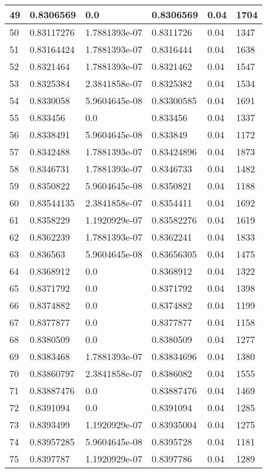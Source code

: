 \begin{longtable}{|l|l|l|l|l|l|}
49 & 0.8306569 & 0.0 & 0.8306569 & 0.04 & 1704 \\ \hline 
50 & 0.83117276 & 1.7881393e-07 & 0.8311726 & 0.04 & 1347 \\ \hline 
51 & 0.83164424 & 1.7881393e-07 & 0.8316444 & 0.04 & 1638 \\ \hline 
52 & 0.8321464 & 1.7881393e-07 & 0.8321462 & 0.04 & 1547 \\ \hline 
53 & 0.8325384 & 2.3841858e-07 & 0.8325382 & 0.04 & 1534 \\ \hline 
54 & 0.8330058 & 5.9604645e-08 & 0.83300585 & 0.04 & 1691 \\ \hline 
55 & 0.833456 & 0.0 & 0.833456 & 0.04 & 1337 \\ \hline 
56 & 0.8338491 & 5.9604645e-08 & 0.833849 & 0.04 & 1172 \\ \hline 
57 & 0.8342488 & 1.7881393e-07 & 0.83424896 & 0.04 & 1873 \\ \hline 
58 & 0.8346731 & 1.7881393e-07 & 0.8346733 & 0.04 & 1482 \\ \hline 
59 & 0.8350822 & 5.9604645e-08 & 0.8350821 & 0.04 & 1188 \\ \hline 
60 & 0.83544135 & 2.3841858e-07 & 0.8354411 & 0.04 & 1692 \\ \hline 
61 & 0.8358229 & 1.1920929e-07 & 0.83582276 & 0.04 & 1619 \\ \hline 
62 & 0.8362239 & 1.7881393e-07 & 0.8362241 & 0.04 & 1833 \\ \hline 
63 & 0.836563 & 5.9604645e-08 & 0.83656305 & 0.04 & 1475 \\ \hline 
64 & 0.8368912 & 0.0 & 0.8368912 & 0.04 & 1322 \\ \hline 
65 & 0.8371792 & 0.0 & 0.8371792 & 0.04 & 1398 \\ \hline 
66 & 0.8374882 & 0.0 & 0.8374882 & 0.04 & 1199 \\ \hline 
67 & 0.8377877 & 0.0 & 0.8377877 & 0.04 & 1158 \\ \hline 
68 & 0.8380509 & 0.0 & 0.8380509 & 0.04 & 1277 \\ \hline 
69 & 0.8383468 & 1.7881393e-07 & 0.83834696 & 0.04 & 1380 \\ \hline 
70 & 0.83860797 & 2.3841858e-07 & 0.8386082 & 0.04 & 1555 \\ \hline 
71 & 0.83887476 & 0.0 & 0.83887476 & 0.04 & 1469 \\ \hline 
72 & 0.8391094 & 0.0 & 0.8391094 & 0.04 & 1285 \\ \hline 
73 & 0.8393499 & 1.1920929e-07 & 0.83935004 & 0.04 & 1275 \\ \hline 
74 & 0.83957285 & 5.9604645e-08 & 0.8395728 & 0.04 & 1181 \\ \hline 
75 & 0.8397787 & 1.1920929e-07 & 0.8397786 & 0.04 & 1289 \\ \hline 
\end{longtable}